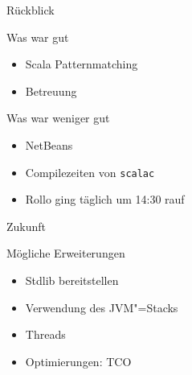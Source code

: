 \documentclass[hyperref={pdfpagelabels=false}]{beamer}
\begin{document}
\begin{frame}{Rückblick}
  \begin{exampleblock}{Was war gut}
    \begin{itemize}
      \item Scala Patternmatching
      \item Betreuung \smiley
    \end{itemize}
  \end{exampleblock}
  \begin{alertblock}{Was war weniger gut}
    \begin{itemize}
      \item NetBeans
      \item Compilezeiten von \texttt{scalac}
      \item Rollo ging täglich um 14:30 rauf \frownie
    \end{itemize}
  \end{alertblock}
\end{frame}

\begin{frame}{Zukunft}
  \begin{block}{Mögliche Erweiterungen}
    \begin{itemize}
      \item Stdlib bereitstellen
      \item Verwendung des JVM"=Stacks
      \item Threads
      \item Optimierungen: TCO
    \end{itemize}
  \end{block}
\end{frame}
\end{document}
